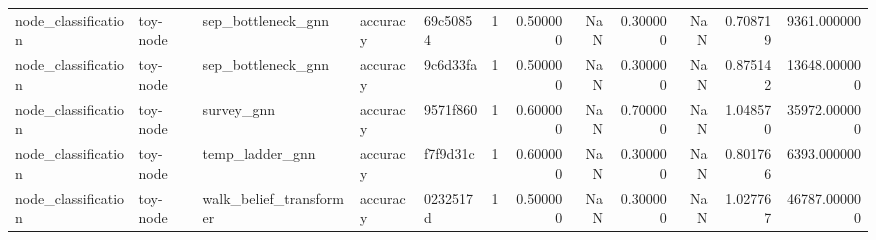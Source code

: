 \begin{tabular}{lllllrrrrrrr}
node_classification & toy-node & sep_bottleneck_gnn & accuracy & 69c50854 & 1 & 0.500000 & NaN & 0.300000 & NaN & 0.708719 & 9361.000000 \\
node_classification & toy-node & sep_bottleneck_gnn & accuracy & 9c6d33fa & 1 & 0.500000 & NaN & 0.300000 & NaN & 0.875142 & 13648.000000 \\
node_classification & toy-node & survey_gnn & accuracy & 9571f860 & 1 & 0.600000 & NaN & 0.700000 & NaN & 1.048570 & 35972.000000 \\
node_classification & toy-node & temp_ladder_gnn & accuracy & f7f9d31c & 1 & 0.600000 & NaN & 0.300000 & NaN & 0.801766 & 6393.000000 \\
node_classification & toy-node & walk_belief_transformer & accuracy & 0232517d & 1 & 0.500000 & NaN & 0.300000 & NaN & 1.027767 & 46787.000000 \\
\bottomrule
\end{tabular}
